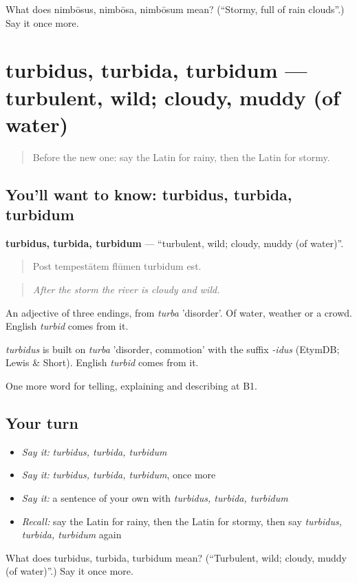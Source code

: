 \begin{tcolorbox}[breakable,colback=teal!4,colframe=teal!35!black,title={Before you move on}]
What does nimbōsus, nimbōsa, nimbōsum mean? (\textquotedblleft{}Stormy, full of rain clouds\textquotedblright{}.) Say it once more.
\end{tcolorbox}
\section[turbidus, turbida, turbidum]{turbidus, turbida, turbidum — turbulent, wild; cloudy, muddy (of water)}

\label{lesson:LA-C485-turbidus}



\begin{quote}
Before the new one: say the Latin for rainy, then the Latin for stormy.
\end{quote}

\subsection*{You'll want to know: turbidus, turbida, turbidum}
\textbf{turbidus, turbida, turbidum} — \textquotedblleft{}turbulent, wild; cloudy, muddy (of water)\textquotedblright{}.

\begin{quote}
Post tempestātem flūmen turbidum est.
\end{quote}

\begin{quote}
\emph{After the storm the river is cloudy and wild.}
\end{quote}

An adjective of three endings, from \emph{turba} 'disorder'. Of water, weather or a crowd. English \emph{turbid} comes from it.

\begin{cousinweb}
\emph{turbidus} is built on \emph{turba} 'disorder, commotion' with the suffix \emph{-idus} (EtymDB; Lewis \& Short). English \emph{turbid} comes from it.
\end{cousinweb}

\begin{grammarlens}[title={What you've built}]
One more word for telling, explaining and describing at B1.
\end{grammarlens}

\subsection*{Your turn}
\begin{itemize}
\raggedright
  \item \emph{Say it:} \emph{turbidus, turbida, turbidum}
  \item \emph{Say it:} \emph{turbidus, turbida, turbidum}, once more
  \item \emph{Say it:} a sentence of your own with \emph{turbidus, turbida, turbidum}
  \item \emph{Recall:} say the Latin for rainy, then the Latin for stormy, then say \emph{turbidus, turbida, turbidum} again
\end{itemize}

\begin{tcolorbox}[breakable,colback=teal!4,colframe=teal!35!black,title={Before you move on}]
What does turbidus, turbida, turbidum mean? (\textquotedblleft{}Turbulent, wild; cloudy, muddy (of water)\textquotedblright{}.) Say it once more.
\end{tcolorbox}

